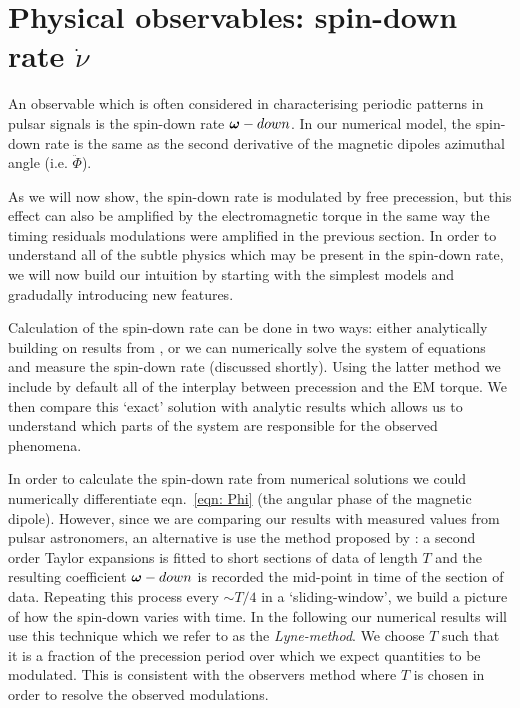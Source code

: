 \documentclass[../full_thesis/full_thesis.tex]{subfiles}
\begin{document}

\section{Physical observables: spin-down rate $\dot{\nu}$}
An observable which is often considered in characterising periodic patterns in
pulsar signals is the spin-down rate $\boldsymbol{\omega}-down$. In our numerical model, the
spin-down rate is the same as the second derivative of the magnetic dipoles
azimuthal angle (i.e. $\ddot{\Phi}$).

As we will now show, the spin-down rate is modulated by free precession, but
this effect can also be amplified by the electromagnetic torque in the same way
the timing residuals modulations were amplified in the previous section.
In order to understand all of the subtle physics which
may be present in the spin-down rate, we will now build our intuition by starting
with the simplest models and gradudally introducing new features.

Calculation of the spin-down rate can be done in two ways: either analytically
building on results from \citet{Jones2001}, or we can numerically solve the
system of equations and measure the spin-down rate (discussed shortly). Using the
latter method we include by default all of the interplay between precession and
the EM torque. We then compare this `exact' solution with analytic results
which allows us to understand which parts of the system are responsible for the
observed phenomena.

In order to calculate the spin-down rate from numerical solutions we could
numerically differentiate eqn.~\eqref{eqn: Phi} (the angular phase of the
magnetic dipole). However, since we are comparing our results with measured
values from pulsar astronomers, an alternative is use the method proposed by
\citet{Lyne2010}: a second order Taylor expansions is fitted to short sections
of data of length $T$ and the resulting coefficient $\boldsymbol{\omega}-down$ is recorded the
mid-point in time of the section of data. Repeating this process every $\sim
T/4$ in a `sliding-window', we build a picture of how the spin-down varies with time.
In the following our numerical results will use this technique which we refer
to as the \emph{Lyne-method}.
We choose $T$ such that it is a fraction of the precession period over which we
expect quantities to be modulated. This is consistent with the observers method
where $T$ is chosen in order to resolve the observed modulations.
\end{document}
